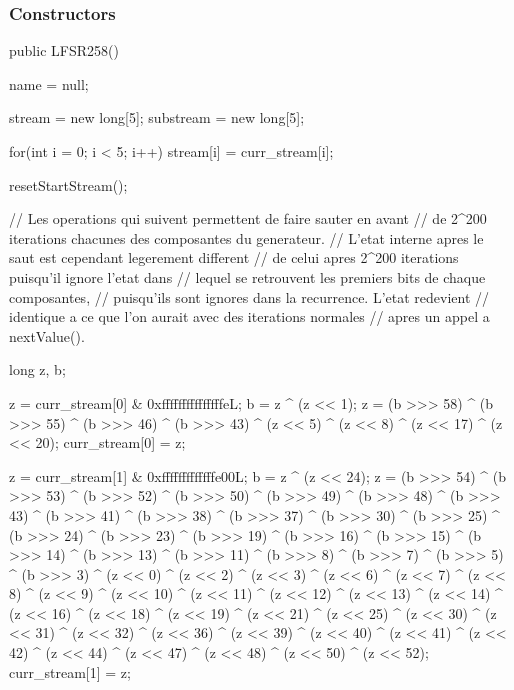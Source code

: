 \subsubsection* {Constructors}

\begin{code}
    public LFSR258() \begin{hide} {
        name = null;

        stream = new long[5];
        substream = new long[5];

        for(int i = 0; i < 5; i++)
            stream[i] = curr_stream[i];

        resetStartStream();

        // Les operations qui suivent permettent de faire sauter en avant
        // de 2^200 iterations chacunes des composantes du generateur.
        // L'etat interne apres le saut est cependant legerement different
        // de celui apres 2^200 iterations puisqu'il ignore l'etat dans
        // lequel se retrouvent les premiers bits de chaque composantes,
        // puisqu'ils sont ignores dans la recurrence. L'etat redevient
        // identique a ce que l'on aurait avec des iterations normales
        // apres un appel a nextValue().

        long z, b;

        z = curr_stream[0] & 0xfffffffffffffffeL;
        b = z ^ (z << 1);
        z = (b >>> 58) ^ (b >>> 55) ^ (b >>> 46) ^ (b >>> 43) ^ (z << 5) ^
            (z << 8) ^ (z << 17) ^ (z << 20);
        curr_stream[0] = z;


        z = curr_stream[1] & 0xfffffffffffffe00L;
        b = z ^ (z << 24);
        z = (b >>> 54) ^ (b >>> 53) ^ (b >>> 52) ^ (b >>> 50) ^ (b >>> 49) ^
            (b >>> 48) ^ (b >>> 43) ^ (b >>> 41) ^ (b >>> 38) ^ (b >>> 37) ^
            (b >>> 30) ^ (b >>> 25) ^ (b >>> 24) ^ (b >>> 23) ^ (b >>> 19) ^
            (b >>> 16) ^ (b >>> 15) ^ (b >>> 14) ^ (b >>> 13) ^ (b >>> 11) ^
            (b >>> 8) ^ (b >>> 7) ^ (b >>> 5) ^ (b >>> 3) ^ (z << 0) ^
            (z << 2) ^ (z << 3) ^ (z << 6) ^ (z << 7) ^ (z << 8) ^ (z << 9) ^
            (z << 10) ^ (z << 11) ^ (z << 12) ^ (z << 13) ^ (z << 14) ^
            (z << 16) ^ (z << 18) ^ (z << 19) ^ (z << 21) ^ (z << 25) ^
            (z << 30) ^ (z << 31) ^ (z << 32) ^ (z << 36) ^ (z << 39) ^
            (z << 40) ^ (z << 41) ^ (z << 42) ^ (z << 44) ^ (z << 47) ^
            (z << 48) ^ (z << 50) ^ (z << 52);
        curr_stream[1] = z;


}
\end{hide}
\end{code}
